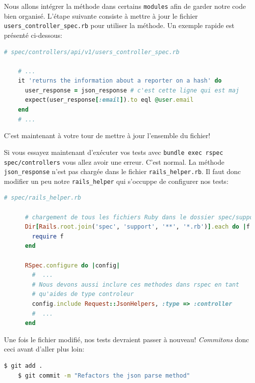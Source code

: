\documentclass[]{report}
\begin{document}
    Nous allons intégrer la méthode dans certains \verb|modules| afin de garder notre code bien organisé. L'étape suivante consiste à mettre à jour le fichier \verb|users_controller_spec.rb| pour utiliser la méthode. Un exemple rapide est présenté ci-dessous:


    \begin{scriptsize}
    \begin{lstlisting}[language=ruby]
    # spec/controllers/api/v1/users_controller_spec.rb

    # ...
    it 'returns the information about a reporter on a hash' do
      user_response = json_response # c'est cette ligne qui est maj
      expect(user_response[:email]).to eql @user.email
    end
    # ...
    \end{lstlisting}
    \end{scriptsize}

    C'est maintenant à votre tour de mettre à jour l'ensemble du fichier!

    Si vous essayez maintenant d'exécuter vos tests avec \verb|bundle exec rspec spec/controllers| vous allez avoir une erreur. C'est normal. La méthode \verb|json_response| n'est pas chargée dans le fichier \verb|rails_helper.rb|. Il faut donc modifier un peu notre \verb|rails_helper| qui s'occuppe de configurer nos tests:

    \begin{scriptsize}
      \begin{lstlisting}[language=ruby, caption={Ajout des méthodes de request\_helpers.rb}]
      # spec/rails_helper.rb

      # chargement de tous les fichiers Ruby dans le dossier spec/support
      Dir[Rails.root.join('spec', 'support', '**', '*.rb')].each do |f|
        require f
      end

      RSpec.configure do |config|
        #  ...
        # Nous devons aussi inclure ces methodes dans rspec en tant
        # qu'aides de type controleur
        config.include Request::JsonHelpers, :type => :controller
        #  ...
      end
      \end{lstlisting}
    \end{scriptsize}

    Une fois le fichier modifié, nos tests devraient passer à nouveau! \textit{Commitons} donc ceci avant d'aller plus loin:

    \begin{scriptsize}
    \begin{lstlisting}[language=bash]
    $ git add .
    $ git commit -m "Refactors the json parse method"
    \end{lstlisting}
    \end{scriptsize}
\end{document}
